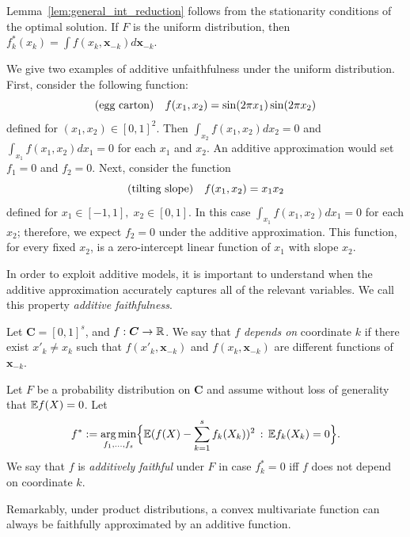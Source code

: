 Lemma~\ref{lem:general_int_reduction} follows from the stationarity
conditions of the optimal solution. If $F$ is the uniform distribution,
then $f^*_k(x_k) = \int f(x_k, \mathbf{x}_{-k})
d\mathbf{x}_{-k}$.

\begin{example} We give two examples of additive unfaithfulness under
  the uniform distribution. First, consider the following function:
\[
\textrm{(egg carton)} \quad f(x_1, x_2) = \sin( 2\pi x_1) \sin( 2 \pi x_2)
\]
defined for $(x_1, x_2) \in [0,1]^2$.  Then
$\int_{x_2} f(x_1, x_2) d x_2 = 0$ and
$\int_{x_1} f(x_1, x_2) d x_1 = 0$ for each $x_1$ and $x_2$. An additive approximation
would set $f_1 = 0$ and $f_2 = 0$.  Next, consider the function
\[
\textrm{(tilting slope)} \quad f(x_1, x_2) = x_1 x_2
\]
defined for $x_1 \in [-1,1],\; x_2 \in [0,1]$.  In this case
$\int_{x_1} f(x_1, x_2) d x_1 = 0$ for each $x_2$; therefore, we expect $f_2 = 0$ under the additive approximation. This function, for every fixed $x_2$, is a zero-intercept linear function of $x_1$ with slope $x_2$.
\end{example}

In order to exploit additive models, it is important to understand when the
additive approximation accurately captures all of the relevant variables.
We call this property \emph{additive faithfulness}.

\begin{definition}
  Let $\mathbf{C}=[0,1]^s$, and $f:\mbox{\boldmath $C$}\rightarrow \mathbb{R}$. We say
  that $f$ \emph{depends on} coordinate $k$ if there exist $x'_k \neq
  x_k$ such that $f(x'_k, \mathbf{x}_{-k})$ and $f(x_k,
  \mathbf{x}_{-k})$ are different functions of $\mathbf{x}_{-k}$.

Let $F$ be a probability distribution on $\mathbf{C}$ and
assume without loss of generality that ${\mathbb E} f(X) = 0$. Let 
\begin{equation}
f^* := \mathop{\text{\rm arg\,min}}_{f_1,\ldots, f_s} \Bigl\{ {\mathbb E} ( f(X) - \sum_{k=1}^s
f_k(X_k) )^2 \,:\, {\mathbb E} f_k(X_k) = 0 \Bigr\}.
\end{equation}
We say that $f$ is \emph{additively faithful} under $F$ in case $f^*_k = 0$ iff $f$ does not depend on coordinate $k$. 
\end{definition}

Remarkably, under product distributions, a convex multivariate function can always be faithfully approximated by an additive function. 

